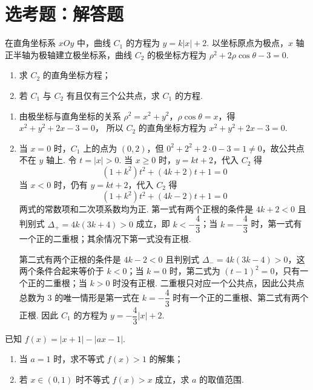 \section{选考题：解答题}

\begin{problem}
在直角坐标系 \(xOy\) 中，曲线 \(C_1\) 的方程为 \(y=k|x|+2\). 以坐标原点为极点，\(x\) 轴正半轴为极轴建立极坐标系，曲线 \(C_2\) 的极坐标方程为 \(\rho^2+2\rho\cos\theta-3=0\).

\begin{enumerate}
\item 求 \(C_2\) 的直角坐标方程；
\item 若 \(C_1\) 与 \(C_2\) 有且仅有三个公共点，求 \(C_1\) 的方程.
\end{enumerate}
\end{problem}

\begin{solution}
\begin{enumerate}
\item 由极坐标与直角坐标的关系 \(\rho^2=x^2+y^2\)，\(\rho\cos\theta=x\)，得 \(x^2+y^2+2x-3=0\)，
所以 \(C_2\) 的直角坐标方程为 \(x^2+y^2+2x-3=0\).
\item 当 \(x=0\) 时，\(C_1\) 上的点为 \((0,2)\)，但 \(0^2+2^2+2\cdot0-3=1\neq0\)，故公共点不在 \(y\) 轴上. 令 \(t=|x|>0\). 当 \(x\geq0\) 时，\(y=kt+2\)，代入 \(C_2\) 得
\[
(1+k^2)t^2+(4k+2)t+1=0
\]
当 \(x<0\) 时，仍有 \(y=kt+2\)，代入 \(C_2\) 得
\[
(1+k^2)t^2+(4k-2)t+1=0
\]
两式的常数项和二次项系数均为正. 第一式有两个正根的条件是 \(4k+2<0\) 且判别式 \(\Delta_+=4k(3k+4)>0\) 成立，即 \(k<-\dfrac43\)；当 \(k=-\dfrac43\) 时，第一式有一个正的二重根；其余情况下第一式没有正根.

第二式有两个正根的条件是 \(4k-2<0\) 且判别式 \(\Delta_-=4k(3k-4)>0\)，这两个条件合起来等价于 \(k<0\)；当 \(k=0\) 时，第二式为 \((t-1)^2=0\)，只有一个正的二重根；当 \(k>0\) 时没有正根. 二重根只对应一个公共点，因此公共点总数为 \(3\) 的唯一情形是第一式在 \(k=-\dfrac43\) 时有一个正的二重根、第二式有两个正根. 因此 \(C_1\) 的方程为 \(y=-\dfrac43|x|+2\).
\end{enumerate}
\end{solution}

\begin{problem}
已知 \(f(x)=|x+1|-|ax-1|\).

\begin{enumerate}
\item 当 \(a=1\) 时，求不等式 \(f(x)>1\) 的解集；
\item 若 \(x\in(0,1)\) 时不等式 \(f(x)>x\) 成立，求 \(a\) 的取值范围.
\end{enumerate}
\end{problem}

